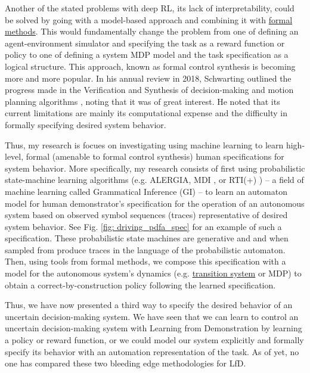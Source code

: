 Another of the stated problems with deep RL, its lack of interpretability, could be solved by going with a model-based approach and combining it with \href{https://en.wikipedia.org/wiki/Formal_methods}{formal methods}. This would fundamentally change the problem from one of defining an agent-environment simulator and specifying the task as a reward function or policy to one of defining a system MDP model and the task specification as a logical structure. This approach, known as formal control synthesis is becoming more and more popular. In his annual review in 2018, Schwarting outlined the progress made in the Verification and Synthesis of decision-making and motion planning algorithms \cite{doi:10.1146/annurev-control-060117-105157}, noting that it was of great interest. He noted that its current limitations are mainly its computational expense and the difficulty in formally specifying desired system behavior. 

Thus, my research is focues on investigating using machine learning to learn high-level, formal (amenable to formal control synthesis) human specifications for system behavior. More specifically, my research consists of first using probabilistic state-machine learning algorithms (e.g. ALERGIA, MDI \cite{prob_state_merging_book}, or RTI(+) \cite{Verwer_PAutomaC}) -- a field of machine learning called Grammatical Inference (GI) -- to learn an automaton model for human demonstrator's specification for the operation of an autonomous system based on observed symbol sequences (traces) representative of desired system behavior. See Fig. \ref{fig: driving_pdfa_spec} for an example of such a specification. These probabilistic state machines are generative and and when sampled from produce traces in the language of the probabilistic automaton. Then, using tools from formal methods, we compose this specification with a model for the autonomous system's dynamics (e.g. \href{https://en.wikipedia.org/wiki/Transition_system}{transition system} or MDP) to obtain a correct-by-construction policy following the learned specification.

Thus, we have now presented a third way to specify the desired behavior of an uncertain decision-making system. We have seen that we can learn to control an uncertain decision-making system with Learning from Demonstration by learning a policy or reward function, or we could model our system explicitly and formally specify its behavior with an automation representation of the task. As of yet, no one has compared these two bleeding edge methodologies for LfD.